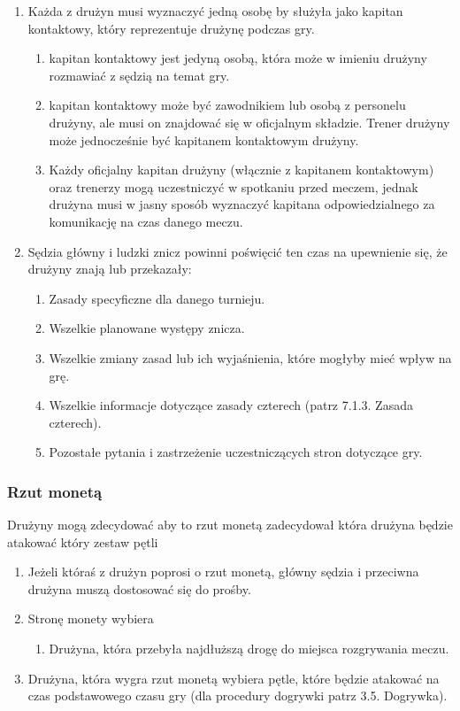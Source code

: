 \documentclass[12pt]{article}
\begin{document}
\begin{enumerate}
\item
    Każda z drużyn musi wyznaczyć jedną osobę by służyła jako kapitan
  kontaktowy, który reprezentuje drużynę podczas gry.
  
  \begin{enumerate}
  \item
        kapitan kontaktowy jest jedyną osobą, która może w imieniu drużyny
    rozmawiać z sędzią na temat gry.
      \item
        kapitan kontaktowy może być zawodnikiem lub osobą z personelu
    drużyny, ale musi on znajdować się w oficjalnym składzie. Trener
    drużyny może jednocześnie być kapitanem kontaktowym drużyny.
      \item
        Każdy oficjalny kapitan drużyny (włącznie z kapitanem kontaktowym)
    oraz trenerzy mogą uczestniczyć w spotkaniu przed meczem, jednak
    drużyna musi w jasny sposób wyznaczyć kapitana odpowiedzialnego za
    komunikację na czas danego meczu.
      \end{enumerate}
\item
    Sędzia główny i ludzki znicz powinni poświęcić ten czas na upewnienie
  się, że drużyny znają lub przekazały:
  
  \begin{enumerate}
  \item
        Zasady specyficzne dla danego turnieju.
      \item
        Wszelkie planowane występy znicza.
      \item
        Wszelkie zmiany zasad lub ich wyjaśnienia, które mogłyby mieć wpływ
    na grę.
      \item
        Wszelkie informacje dotyczące zasady czterech (patrz 7.1.3. Zasada
    czterech).
      \item
        Pozostałe pytania i zastrzeżenie uczestniczących stron dotyczące
    gry.
      \end{enumerate}
\end{enumerate}

\subsubsection{Rzut monetą}
Drużyny mogą zdecydować aby to rzut
monetą zadecydował która drużyna będzie atakować który zestaw pętli

\begin{enumerate}
\item
    Jeżeli któraś z drużyn poprosi o rzut monetą, główny sędzia i
  przeciwna drużyna muszą dostosować się do prośby.
  \item
    Stronę monety wybiera
  
  \begin{enumerate}
  \item
        Drużyna, która przebyła najdłuższą drogę do miejsca rozgrywania
    meczu.
      \end{enumerate}
\item
    Drużyna, która wygra rzut monetą wybiera pętle, które będzie atakować
  na czas podstawowego czasu gry (dla procedury dogrywki patrz 3.5.
  Dogrywka).
  \end{enumerate}
\end{document}
